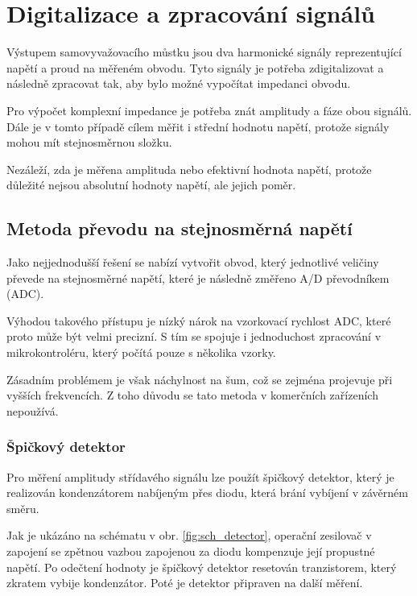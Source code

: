\chapter{Digitalizace a zpracování signálů}

Výstupem samovyvažovacího můstku jsou dva harmonické signály 
reprezentující napětí a proud na měřeném obvodu. 
Tyto signály je potřeba zdigitalizovat a následně zpracovat tak, aby bylo možné vypočítat impedanci obvodu.

Pro výpočet komplexní impedance je potřeba znát amplitudy a fáze obou signálů.
Dále je v tomto případě cílem měřit i střední hodnotu napětí, protože signály mohou mít stejnosměrnou složku.

Nezáleží, zda je měřena amplituda nebo efektivní hodnota napětí, protože důležité nejsou absolutní hodnoty napětí, ale jejich poměr.

\section{Metoda převodu na stejnosměrná napětí}
\label{sec:digit_DC}

Jako nejjednodušší řešení se nabízí vytvořit obvod, 
který jednotlivé veličiny převede na stejnosměrné napětí, které je následně změřeno \acs{A/D} převodníkem (\acs{ADC}).

Výhodou takového přístupu je nízký nárok na vzorkovací rychlost ADC, které proto může být velmi precizní.
S tím se spojuje i jednoduchost zpracování v mikrokontroléru, který počítá pouze s několika vzorky.

Zásadním problémem je však náchylnost na šum, což se zejména projevuje při vyšších frekvencích.
Z toho důvodu se tato metoda v komerčních zařízeních nepoužívá.

\subsection{Špičkový detektor}
Pro měření amplitudy střídavého signálu lze použít špičkový detektor, který je realizován
kondenzátorem nabíjeným přes diodu, která brání vybíjení v závěrném směru.

Jak je ukázáno na schématu v obr. \ref{fig:sch_detector}, operační zesilovač v zapojení  se zpětnou vazbou zapojenou za diodu kompenzuje její propustné napětí.
Po odečtení hodnoty je špičkový detektor resetován tranzistorem, který zkratem vybije kondenzátor.
Poté je detektor připraven na další měření. \cite{elliott_peakdetection}


